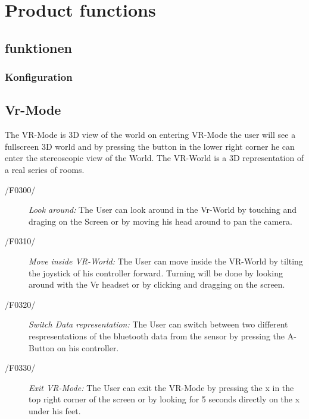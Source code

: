 \section{Product functions}

\subsection{funktionen}


\subsubsection{Konfiguration}


\subsection{Vr-Mode}

The VR-Mode is 3D view of the world on entering VR-Mode the user will see a fullscreen 3D world and by pressing the button in the lower right corner he can enter the  stereoscopic view of the World.
The VR-World is a 3D representation of a real series of rooms.
\begin{description}
  \item[/F0300/]
    \textit{Look around:} The User can look around in the Vr-World by touching and draging on the Screen or by moving his head around to pan the camera.
\end{description}

\begin{description}
  \item[/F0310/]
    \textit{Move inside VR-World:} The User can move inside the VR-World by tilting the joystick of his controller forward. Turning will be done by looking around with the Vr headset
                                  or by clicking and dragging on the screen.
\end{description}

\begin{description}
  \item[/F0320/]
    \textit{Switch Data representation:} The User can switch between two different respresentations of the bluetooth data from the sensor by pressing the A-Button on his controller.
\end{description}

\begin{description}
  \item[/F0330/]
    \textit{Exit VR-Mode:} The User can exit the VR-Mode by pressing the x in the top right corner of the screen or by looking for 5 seconds directly on the x under his feet.
\end{description}

